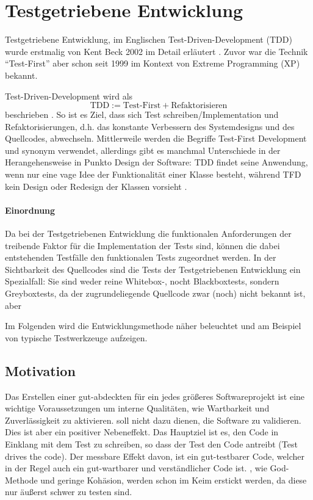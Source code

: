 \section{Testgetriebene Entwicklung}
\label{sec:tdd}
Testgetriebene Entwicklung, im Englischen Test-Driven-Development (TDD) wurde erstmalig von Kent Beck 2002 im Detail erläutert \citep{beck_test_2002}. Zuvor war die Technik "`Test-First"' aber schon seit 1999 im Kontext von Extreme Programming (XP) bekannt.

Test-Driven-Development wird als
$$ \text{TDD} := \text{Test-First} + \text{Refaktorisieren}$$
beschrieben \citep{scott_ambler_introduction_2002}. So ist es Ziel, dass sich Test schreiben/Implementation und Refaktorisierungen, d.h. das konstante Verbessern des Systemdesigns und des Quellcodes, abwechseln. Mittlerweile werden die Begriffe Test-First Development und  synonym verwendet, allerdings gibt es manchmal Unterschiede in der Herangehensweise in Punkto Design der Software: TDD findet seine Anwendung, wenn nur eine vage Idee der Funktionalität einer Klasse besteht, während TFD kein Design oder Redesign der Klassen vorsieht \citep{stackoverflow_testing_2008}.

\paragraph{Einordnung} Da bei der Testgetriebenen Entwicklung die funktionalen Anforderungen der treibende Faktor für die Implementation der Tests sind, können die dabei entstehenden Testfälle den funktionalen Tests zugeordnet werden. In der Sichtbarkeit des Quellcodes sind die Tests der Testgetriebenen Entwicklung ein Spezialfall: Sie sind weder reine Whitebox-, nocht Blackboxtests, sondern Greyboxtests, da der zugrundeliegende Quellcode zwar (noch) nicht bekannt ist, aber 


Im Folgenden wird die Entwicklungsmethode  näher beleuchtet und am Beispiel von  typische Testwerkzeuge aufzeigen. 
\subsection{Motivation}
  Das Erstellen einer gut-abdeckten  für ein jedes größeres Softwareprojekt ist eine wichtige Voraussetzungen um interne Qualitäten, wie Wartbarkeit und Zuverlässigkeit zu aktivieren.  soll nicht dazu dienen, die Software zu validieren. Dies ist aber ein positiver Nebeneffekt. Das Hauptziel ist es, den Code in Einklang mit dem Test zu schreiben, so dass der Test den Code antreibt (Test drives the code). Der messbare Effekt davon, ist ein gut-testbarer Code, welcher in der Regel auch ein gut-wartbarer und verständlicher Code ist. , wie God-Methode und geringe Kohäsion, werden schon im Keim erstickt werden, da diese nur äußerst schwer zu testen sind.

